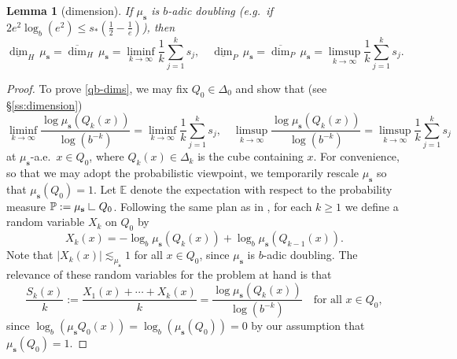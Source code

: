 \documentclass[12pt]{amsart}
\newtheorem{lemma}[theorem]{Lemma}
\theoremstyle{definition}
\theoremstyle{remark}
\newcommand{\EE}{\mathbb{E}}
\newcommand{\PP}{\mathbb{P}}
\newcommand{\res}{\hbox{ {\vrule height .22cm}{\leaders\hrule\hskip.2cm} }} %
\newcommand{\muse}{\mu_{\mathbf{s}}}
\numberwithin{figure}{section}
\numberwithin{equation}{section}
\begin{document}
\begin{lemma}[dimension]\label{qb-dimension} If $\muse$ is $b$-adic doubling (e.g.~if $2e^2\log_b(e^2)\leq s_*(\tfrac12-\tfrac{1}{e})$), then \begin{equation}\label{qb-dims} \underline{\dim}_H\,\muse=\overline{\dim}_H\,\muse=\liminf_{k\rightarrow\infty} \frac{1}{k}\sum_{j=1}^k s_j,\quad\underline{\dim}_P\,\muse=\overline{\dim}_P\,\muse=\limsup_{k\rightarrow\infty}\frac{1}{k}\sum_{j=1}^k s_j.\end{equation}\end{lemma}

\begin{proof} To prove \eqref{qb-dims}, we may fix $Q_0\in\Delta_0$ and show that (see \S\ref{ss:dimension}) $$\liminf_{k\rightarrow\infty} \frac{\log\muse(Q_k(x))}{\log(b^{-k})}=\liminf_{k\rightarrow\infty} \frac{1}{k}\sum_{j=1}^k s_j,\quad \limsup_{k\rightarrow\infty} \frac{\log\muse(Q_k(x))}{\log(b^{-k})}=\limsup_{k\rightarrow\infty} \frac{1}{k}\sum_{j=1}^k s_j$$ at $\muse$-a.e.~$x\in Q_0$, where $Q_k(x)\in\Delta_k$ is the cube containing $x$. For convenience, so that we may adopt the probabilistic viewpoint, we temporarily rescale $\muse$ so that $\muse(Q_0)=1$. Let $\EE$ denote the expectation with respect to the probability measure $\PP:=\muse\res Q_0$. Following the same plan as in \cite[\S3]{dimension-of-measures}, for each $k\geq 1$ we define a random variable $X_k$ on $Q_0$ by \begin{equation*}X_k(x)=-\log_b \muse(Q_k(x)) + \log_b \muse(Q_{k-1}(x)).\end{equation*} Note that $|X_k(x)|\lesssim_{\muse} 1$ for all $x\in Q_0$, since $\muse$ is $b$-adic doubling. The relevance of these random variables for the problem at hand is that \begin{equation}\label{S-average}\frac{S_k(x)}{k}:=\frac{X_1(x)+\cdots+X_k(x)}{k}=\frac{\log \muse(Q_k(x))}{\log (b^{-k})}\quad\text{for all }x\in Q_0,\end{equation} since $\log_b(\muse Q_0(x))=\log_b(\muse(Q_0))=0$ by our assumption that $\muse(Q_0)=1$.


\end{proof}
\end{document}
